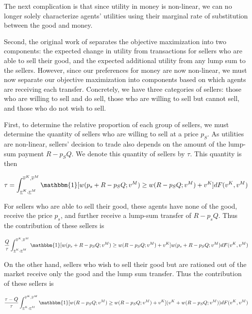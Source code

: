 \documentclass[AER]{AEA}
\begin{document}
The next complication is that since utility in money is non-linear, we can no longer solely characterize agents' utilities using their marginal rate of substitution between the good and money.

Second, the original work of \cite{dworczak-2020} separates the objective maximization into two components: the expected change in utility from transactions for sellers who are able to sell their good, and the expected additional utility from any lump sum to the sellers. However, since our preferences for money are now non-linear, we must now separate our objective maximization into components based on which agents are receiving each transfer. Concretely, we have three categories of sellers: those who are willing to sell and do sell, those who are willing to sell but cannot sell, and those who do not wish to sell.

First, to determine the relative proportion of each group of sellers, we must determine the quantity of sellers who are willing to sell at a price $p_S$. As utilities are non-linear, sellers' decision to trade also depends on the amount of the lump-sum payment $R - p_S Q$. We denote this quantity of sellers by $\tau$. This quantity is then

$$
\tau = \int_{\underline{v}^K, \underline{v}^M}^{\overline{v}^K, \overline{v}^M} \mathbbm{1}[w(p_s + R - p_SQ; v^M) \ge w(R - p_S Q ; v^M) + v^K] dF(v^K, v^M)
$$

For sellers who are able to sell their good, these agents have none of the good, receive the price $p_s$, and further receive a lump-sum transfer of $R - p_s Q$. Thus the contribution of these sellers is

\begin{equation}
    \frac{Q}{\tau} \int_{\underline{v}^K, \underline{v}^M}^{\overline{v}^K, \overline{v}^M} \mathbbm{1}[w(p_s + R - p_SQ; v^M) \ge w(R - p_S Q ; v^M) + v^K] w(p_s + R - p_SQ; v^M) dF(v^K, v^M)
\end{equation}


On the other hand, sellers who wish to sell their good but are rationed out of the market receive only the good and the lump sum transfer. Thus the contribution of these sellers is

\begin{equation}
    \frac{\tau - Q}{\tau} \int_{\underline{v}^K, \underline{v}^M}^{\overline{v}^K, \overline{v}^M} \mathbbm{1}[w(R - p_SQ; v^M) \ge w(R - p_S Q ; v^M) + v^K] (v^K + w(R - p_SQ; v^M)) dF(v^K, v^M)
\end{equation}
\end{document}
